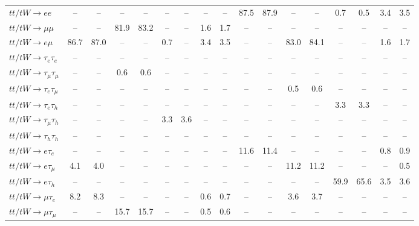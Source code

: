 \begin{sidewaystable}[p]
\begin{tabular}{|l|cc|cc|cc|cc|cc|cc|cc|cc|}
    $tt/tW \to ee$                     &   -- &   -- &   -- &   -- &   -- &   -- &   -- &   -- & 87.5 & 87.9 &   -- &   -- &  0.7 &  0.5 &  3.4 &  3.5 \\ 
    $tt/tW \to \mu\mu$                 &   -- &   -- & 81.9 & 83.2 &   -- &   -- &  1.6 &  1.7 &   -- &   -- &   -- &   -- &   -- &   -- &   -- &   -- \\ 
    $tt/tW \to e\mu$                   & 86.7 & 87.0 &   -- &   -- &  0.7 &   -- &  3.4 &  3.5 &   -- &   -- & 83.0 & 84.1 &   -- &   -- &  1.6 &  1.7 \\ 
    $tt/tW \to \tau_{e}\tau_{e}$       &   -- &   -- &   -- &   -- &   -- &   -- &   -- &   -- &   -- &   -- &   -- &   -- &   -- &   -- &   -- &   -- \\ 
    $tt/tW \to \tau_{\mu}\tau_{\mu}$   &   -- &   -- &  0.6 &  0.6 &   -- &   -- &   -- &   -- &   -- &   -- &   -- &   -- &   -- &   -- &   -- &   -- \\ 
    $tt/tW \to \tau_{e}\tau_{\mu}$     &   -- &   -- &   -- &   -- &   -- &   -- &   -- &   -- &   -- &   -- &  0.5 &  0.6 &   -- &   -- &   -- &   -- \\ 
    $tt/tW \to \tau_{e}\tau_{h}$       &   -- &   -- &   -- &   -- &   -- &   -- &   -- &   -- &   -- &   -- &   -- &   -- &  3.3 &  3.3 &   -- &   -- \\ 
    $tt/tW \to \tau_{\mu}\tau_{h}$     &   -- &   -- &   -- &   -- &  3.3 &  3.6 &   -- &   -- &   -- &   -- &   -- &   -- &   -- &   -- &   -- &   -- \\ 
    $tt/tW \to \tau_{h}\tau_{h}$       &   -- &   -- &   -- &   -- &   -- &   -- &   -- &   -- &   -- &   -- &   -- &   -- &   -- &   -- &   -- &   -- \\ 
    $tt/tW \to e\tau_{e}$              &   -- &   -- &   -- &   -- &   -- &   -- &   -- &   -- & 11.6 & 11.4 &   -- &   -- &   -- &   -- &  0.8 &  0.9 \\ 
    $tt/tW \to e\tau_{\mu}$            &  4.1 &  4.0 &   -- &   -- &   -- &   -- &   -- &   -- &   -- &   -- & 11.2 & 11.2 &   -- &   -- &   -- &  0.5 \\ 
    $tt/tW \to e\tau_{h}$              &   -- &   -- &   -- &   -- &   -- &   -- &   -- &   -- &   -- &   -- &   -- &   -- & 59.9 & 65.6 &  3.5 &  3.6 \\ 
    $tt/tW \to \mu\tau_{e}$            &  8.2 &  8.3 &   -- &   -- &   -- &   -- &  0.6 &  0.7 &   -- &   -- &  3.6 &  3.7 &   -- &   -- &   -- &   -- \\ 
    $tt/tW \to \mu\tau_{\mu}$          &   -- &   -- & 15.7 & 15.7 &   -- &   -- &  0.5 &  0.6 &   -- &   -- &   -- &   -- &   -- &   -- &   -- &   -- \\ 

\end{tabular}
\end{sidewaystable}
